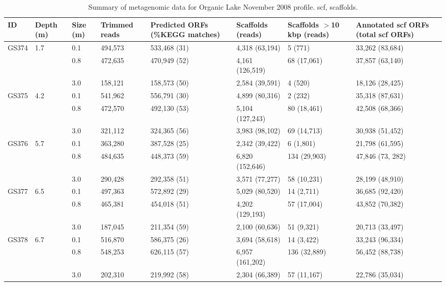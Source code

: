 \begin{table}
\footnotesize
\caption[Summary of metagenomic data for Organic Lake profile]{Summary of metagenomic data for Organic Lake November 2008 profile. scf, scaffolds.}
\label{tab:metag}
\smallskip
\begin{tabularx}{\textwidth}{p{0.7cm}p{0.8cm}p{0.6cm}p{1.2cm}p{1.8cm}Xp{1.8cm}X}
\toprule
\textbf{ID} & \textbf{Depth (m)} & \textbf{Size (\textmu{}m)} & \textbf{Trimmed reads} & \textbf{Predicted \acp{ORF} (\%\ac{KEGG} matches)} & \textbf{Scaffolds (reads)} & \textbf{Scaffolds $>$10 kbp (reads)} & \textbf{Annotated scf \acp{ORF} (total scf \acp{ORF})} \\
\midrule
GS374 & 1.7 & 0.1 & 494,573 & 533,468 (31) & 4,318 (63,194) & 5 (771) & 33,262 (83,684)\\
 &  & 0.8 & 472,635 & 470,949 (52) & 4,161 (126,519) & 68 (17,061) & 37,857 (63,140)\\
 &  & 3.0 & 158,121 & 158,573 (50) & 2,584 (39,591) & 4 (520) & 18,126 (28,425)\\
GS375 & 4.2 & 0.1 & 541,962 & 556,791 (30) & 4,899 (80,316) & 2 (232) & 35,318 (87,631)\\
 &  & 0.8 & 472,570 & 492,130 (53) & 5,104 (127,243) & 80 (18,461) & 42,508 (68,366)\\
 &  & 3.0 & 321,112 & 324,365 (56) & 3,983 (98,102) & 69 (14,713) & 30,938 (51,452)\\
GS376 & 5.7 & 0.1 & 363,280 & 387,528 (25) & 2,342 (39,422) & 6 (1,801) & 21,798 (61,595)\\
 &  & 0.8 & 484,635 & 448,373 (59) & 6,820 (152,646) & 134 (29,903) & 47,846 (73, 282)\\
 &  & 3.0 & 290,428 & 292,358 (51) & 3,571 (77,277) & 58 (10,231) & 28,199 (48,910)\\
GS377 & 6.5 & 0.1 & 497,363 & 572,892 (29) & 5,029 (80,520) & 14 (2,711) & 36,685 (92,420)\\
 &  & 0.8 & 465,381 & 454,018 (51) & 4,202 (129,193) & 57 (17,004) & 43,852 (70,382)\\
 &  & 3.0 & 187,045 & 211,354 (59) & 2,100 (60,636) & 51 (9,321) & 20,713 (33,497)\\
GS378 & 6.7 & 0.1 & 516,870 & 586,375 (26) & 3,694 (58,618) & 14 (3,422) & 33,243 (96,334)\\
 &  & 0.8 & 548,253 & 626,115 (57) & 6,957 (161,202) & 136 (32,889) & 56,452 (88,738)\\
 &  & 3.0 & 202,310 & 219,992 (58) & 2,304 (66,389) & 57 (11,167) & 22,786 (35,034)\\
\bottomrule
\end{tabularx}
\end{table}
